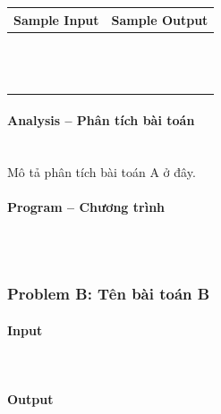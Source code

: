 \documentclass{article}
\begin{document}
\begin{table}[h]
    \centering
    \begin{tabular}{|l|r|}
        \hline
        \textbf{Sample Input} & \textbf{Sample Output} \\
        \hline
		&  \\ 
		&  \\ 
		&  \\ 
		&  \\ 
		&  \\
		&  \\ 
		&  \\ 
		&  \\ 
		&  \\ 
		&  \\ 
		&  \\ 
		&  \\
		&  \\ \hline
    \end{tabular}
\end{table}

\paragraph{Analysis -- Phân tích bài toán} \mbox{} \\

Mô tả phân tích bài toán A ở đây.

\paragraph{Program -- Chương trình} \mbox{} \\

\begin{lstlisting}

\end{lstlisting}

\subsubsection{Problem B: Tên bài toán B}

\paragraph{Input} \mbox{} \\



\paragraph{Output}\mbox{} \\
\end{document}
